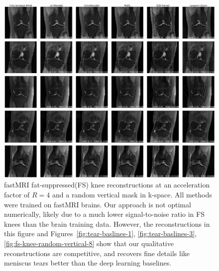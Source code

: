 \begin{figure}
    \centering
    \includegraphics[width=\columnwidth]{fs-random-vertical-R=4-comp.pdf}
    \caption{\small fastMRI fat-suppressed(FS) knee reconstructions at an acceleration factor of $R=4$ and a random vertical mask in k-space. All methods were trained on fastMRI brains. Our approach is not optimal numerically, likely due to a much lower signal-to-noise ratio in FS knees than the brain training data. However, the reconstructions in this figure and Figures~\ref{fig:tear-baslines-1}, \ref{fig:tear-baslines-3}, \ref{fig:fs-knee-random-vertical-8} show that our qualitative reconstructions are competitive, and recovers fine details like meniscus tears better than the deep learning baselines.}
    \label{fig:fs-knee-random-vertical-4}
\end{figure}

